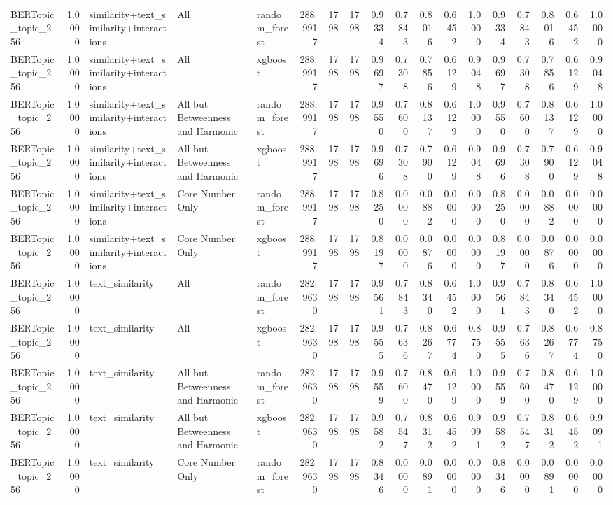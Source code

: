 \begin{tabular}{lrlllrrrrrrrrrrrrr}
BERTopic_topic_256 & 1.0000 & similarity+text_similarity+interactions & All & random_forest & 288.9917 & 1798 & 1798 & 0.9334 & 0.7843 & 0.8016 & 0.6452 & 1.0000 & 0.9334 & 0.7843 & 0.8016 & 0.6452 & 1.0000 \\
BERTopic_topic_256 & 1.0000 & similarity+text_similarity+interactions & All & xgboost & 288.9917 & 1798 & 1798 & 0.9697 & 0.7308 & 0.7856 & 0.6129 & 0.9048 & 0.9697 & 0.7308 & 0.7856 & 0.6129 & 0.9048 \\
BERTopic_topic_256 & 1.0000 & similarity+text_similarity+interactions & All but Betweenness and Harmonic & random_forest & 288.9917 & 1798 & 1798 & 0.9550 & 0.7600 & 0.8137 & 0.6129 & 1.0000 & 0.9550 & 0.7600 & 0.8137 & 0.6129 & 1.0000 \\
BERTopic_topic_256 & 1.0000 & similarity+text_similarity+interactions & All but Betweenness and Harmonic & xgboost & 288.9917 & 1798 & 1798 & 0.9696 & 0.7308 & 0.7900 & 0.6129 & 0.9048 & 0.9696 & 0.7308 & 0.7900 & 0.6129 & 0.9048 \\
BERTopic_topic_256 & 1.0000 & similarity+text_similarity+interactions & Core Number Only & random_forest & 288.9917 & 1798 & 1798 & 0.8250 & 0.0000 & 0.0882 & 0.0000 & 0.0000 & 0.8250 & 0.0000 & 0.0882 & 0.0000 & 0.0000 \\
BERTopic_topic_256 & 1.0000 & similarity+text_similarity+interactions & Core Number Only & xgboost & 288.9917 & 1798 & 1798 & 0.8197 & 0.0000 & 0.0876 & 0.0000 & 0.0000 & 0.8197 & 0.0000 & 0.0876 & 0.0000 & 0.0000 \\
BERTopic_topic_256 & 1.0000 & text_similarity & All & random_forest & 282.9630 & 1798 & 1798 & 0.9561 & 0.7843 & 0.8340 & 0.6452 & 1.0000 & 0.9561 & 0.7843 & 0.8340 & 0.6452 & 1.0000 \\
BERTopic_topic_256 & 1.0000 & text_similarity & All & xgboost & 282.9630 & 1798 & 1798 & 0.9555 & 0.7636 & 0.8267 & 0.6774 & 0.8750 & 0.9555 & 0.7636 & 0.8267 & 0.6774 & 0.8750 \\
BERTopic_topic_256 & 1.0000 & text_similarity & All but Betweenness and Harmonic & random_forest & 282.9630 & 1798 & 1798 & 0.9559 & 0.7600 & 0.8470 & 0.6129 & 1.0000 & 0.9559 & 0.7600 & 0.8470 & 0.6129 & 1.0000 \\
BERTopic_topic_256 & 1.0000 & text_similarity & All but Betweenness and Harmonic & xgboost & 282.9630 & 1798 & 1798 & 0.9582 & 0.7547 & 0.8312 & 0.6452 & 0.9091 & 0.9582 & 0.7547 & 0.8312 & 0.6452 & 0.9091 \\
BERTopic_topic_256 & 1.0000 & text_similarity & Core Number Only & random_forest & 282.9630 & 1798 & 1798 & 0.8346 & 0.0000 & 0.0891 & 0.0000 & 0.0000 & 0.8346 & 0.0000 & 0.0891 & 0.0000 & 0.0000 \\

\end{tabular}
